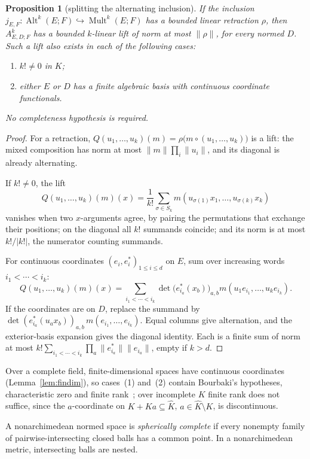 \documentclass[11pt]{amsart}
\newtheorem{proposition}[theorem]{Proposition}
\theoremstyle{definition}
\theoremstyle{remark}
\numberwithin{equation}{section}
\newcommand{\Alt}{\operatorname{Alt}}
\newcommand{\Mult}{\operatorname{Mult}}
\newcommand{\abs}[1]{\lvert #1\rvert}
\newcommand{\norm}[1]{\lVert #1\rVert}
\theoremstyle{plain}
\theoremstyle{definition}
\theoremstyle{plain}
\begin{document}
\begin{proposition}[splitting the alternating inclusion]\label{prop:split-lift}
If the inclusion $j_{E,F}\colon\Alt^k(E;F)\hookrightarrow\Mult^k(E;F)$ has a bounded linear retraction $\rho$, then $A^k_{E,D;F}$ has a bounded $k$-linear lift of norm at most $\norm\rho$, for every normed $D$. Such a lift also exists in each of the following cases:
\begin{enumerate}
\item $k!\ne0$ in $K$;
\item either $E$ or $D$ has a finite algebraic basis with continuous coordinate functionals.
\end{enumerate}
No completeness hypothesis is required.
\end{proposition}
\begin{proof}
For a retraction, $Q(u_1,\ldots,u_k)(m)=\rho\bigl(m\circ(u_1,\ldots,u_k)\bigr)$ is a lift: the mixed composition has
norm at most $\norm m\prod_i\norm{u_i}$, and its diagonal is already alternating.

If $k!\ne0$, the lift
\[
 Q(u_1,\ldots,u_k)(m)(x)
 =\frac1{k!}\sum_{\sigma\in S_k}
 m(u_{\sigma(1)}x_1,\ldots,u_{\sigma(k)}x_k)
\]
vanishes when two $x$-arguments agree, by pairing the permutations that exchange their positions; on the diagonal all
$k!$ summands coincide; and its norm is at most $k!/\abs{k!}$, the numerator counting summands.

For continuous coordinates $(e_i,e^*_i)_{1\le i\le d}$ on $E$, sum over increasing words $i_1<\cdots<i_k$:
\[
 Q(u_1,\ldots,u_k)(m)(x)
 =\sum_{i_1<\cdots<i_k}\det\bigl(e^*_{i_a}(x_b)\bigr)_{a,b}
       m(u_1e_{i_1},\ldots,u_ke_{i_k}).
\]
If the coordinates are on $D$, replace the summand by $\det(e^*_{i_a}(u_ax_b))_{a,b}\,m(e_{i_1},\ldots,e_{i_k})$. Equal
columns give alternation, and the exterior-basis expansion gives the diagonal identity. Each is a finite sum of norm at
most $k!\sum_{i_1<\cdots<i_k}\prod_a\norm{e^*_{i_a}}\norm{e_{i_a}}$, empty if $k>d$.
\end{proof}

Over a complete field, finite-dimensional spaces have continuous coordinates (Lemma~\ref{lem:findim}), so cases~(1)
and~(2) contain Bourbaki's hypotheses, characteristic zero and finite rank~\cite[n\textsuperscript{o}~7.8]{Bou}; over
incomplete $K$ finite rank does not suffice, since the $a$-coordinate on $K+Ka\subseteq\widehat K$,
$a\in\widehat K\setminus K$, is discontinuous.

A nonarchimedean normed space is \emph{spherically complete} if every nonempty family of pairwise-intersecting
closed balls has a common point. In a nonarchimedean metric, intersecting balls are nested.
\end{document}
